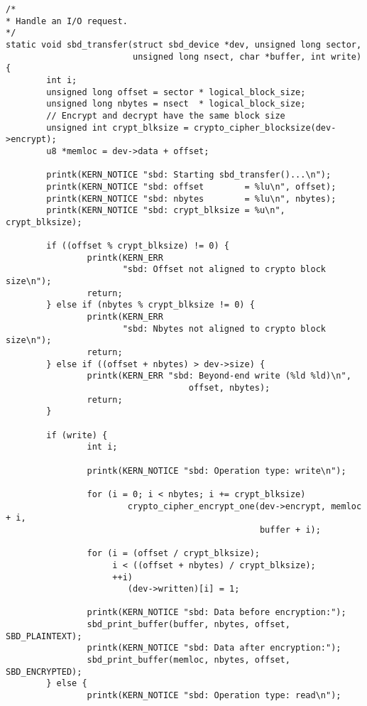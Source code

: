 \documentclass[letterpaper,10pt,titlepage,draftclsnofoot,onecolumn]{article}
\begin{document}
\begin{lstlisting}
/*
* Handle an I/O request.
*/
static void sbd_transfer(struct sbd_device *dev, unsigned long sector,
                         unsigned long nsect, char *buffer, int write)
{
        int i;
        unsigned long offset = sector * logical_block_size;
        unsigned long nbytes = nsect  * logical_block_size;
        // Encrypt and decrypt have the same block size
        unsigned int crypt_blksize = crypto_cipher_blocksize(dev->encrypt);
        u8 *memloc = dev->data + offset;

        printk(KERN_NOTICE "sbd: Starting sbd_transfer()...\n");
        printk(KERN_NOTICE "sbd: offset        = %lu\n", offset);
        printk(KERN_NOTICE "sbd: nbytes        = %lu\n", nbytes);
        printk(KERN_NOTICE "sbd: crypt_blksize = %u\n", crypt_blksize);

        if ((offset % crypt_blksize) != 0) {
                printk(KERN_ERR
                       "sbd: Offset not aligned to crypto block size\n");
                return;
        } else if (nbytes % crypt_blksize != 0) {
                printk(KERN_ERR
                       "sbd: Nbytes not aligned to crypto block size\n");
                return;
        } else if ((offset + nbytes) > dev->size) {
                printk(KERN_ERR "sbd: Beyond-end write (%ld %ld)\n",
                                    offset, nbytes);
                return;
        }

        if (write) {
                int i;

                printk(KERN_NOTICE "sbd: Operation type: write\n");

                for (i = 0; i < nbytes; i += crypt_blksize)
                        crypto_cipher_encrypt_one(dev->encrypt, memloc + i,
                                                  buffer + i);

                for (i = (offset / crypt_blksize);
                     i < ((offset + nbytes) / crypt_blksize);
                     ++i)
                        (dev->written)[i] = 1;

                printk(KERN_NOTICE "sbd: Data before encryption:");
                sbd_print_buffer(buffer, nbytes, offset, SBD_PLAINTEXT);
                printk(KERN_NOTICE "sbd: Data after encryption:");
                sbd_print_buffer(memloc, nbytes, offset, SBD_ENCRYPTED);
        } else {
                printk(KERN_NOTICE "sbd: Operation type: read\n");


\end{lstlisting}
\end{document}
